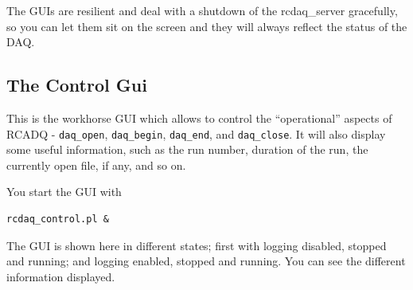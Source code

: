 \documentclass{article}[11pt]
\begin{document}
The GUIs are resilient and deal with a shutdown of the rcdaq\_server
gracefully, so you can let them sit on the screen and they will always
reflect the status of the DAQ.

\subsection{The Control Gui}

This is the workhorse GUI which allows to control the ``operational''
aspects of RCADQ - \verb|daq_open|, \verb|daq_begin|, \verb|daq_end|,
and \verb|daq_close|.  It will also display some useful information, such
as the run number, duration of the run, the currently open file, if
any, and so on.

You start the GUI with 

\begin{verbatim}
rcdaq_control.pl &
\end{verbatim}

The GUI is shown here in different states; first with logging disabled,
stopped and running; and logging enabled, stopped and running. You can see the 
different information displayed. 
\end{document}
